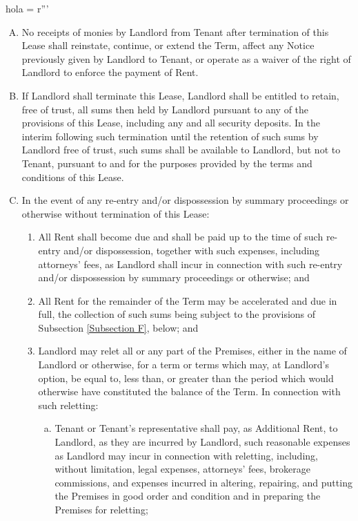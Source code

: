 hola = r'''\documentclass{article}
\begin{document}
\begin{enumerate}[(A)]
    \item	No receipts of monies by Landlord from Tenant after termination of this Lease shall reinstate, continue, or extend the Term, affect any Notice previously given by Landlord to Tenant, or operate as a waiver of the right of Landlord to enforce the payment of Rent.

    \item	If Landlord shall terminate this Lease, Landlord shall be entitled to retain, free of trust, all sums then held by Landlord pursuant to any of the provisions of this Lease, including any and all security deposits. In the interim following such termination until the retention of such sums by Landlord free of trust, such sums shall be available to Landlord, but not to Tenant, pursuant to and for the purposes provided by the terms and conditions of this Lease.

    \item	In the event of any re-entry and/or dispossession by summary proceedings or otherwise without termination of this Lease:
    
    \begin{enumerate}[I]
    \item All Rent shall become due and shall be paid up to the time of such re-entry and/or dispossession, together with such expenses, including attorneys' fees, as Landlord shall incur in connection with such re-entry and/or dispossession by summary proceedings or otherwise; and

    \item All Rent for the remainder of the Term may be accelerated and due in full, the collection of such sums being subject to the provisions of Subsection \ref{Subsection F}, below; and

    \item Landlord may relet all or any part of the Premises, either in the name of Landlord or otherwise, for a term or terms which may, at Landlord's option, be equal to, less than, or greater than the period which would otherwise have constituted the balance of the Term. In connection with such reletting:
    \begin{enumerate}[(a)]
    \item Tenant or Tenant's representative shall pay, as Additional Rent, to Landlord, as they are incurred by Landlord, such reasonable expenses as Landlord may incur in connection with reletting, including, without limitation, legal expenses, attorneys' fees, brokerage commissions, and expenses incurred in altering, repairing, and putting the Premises in good order and condition and in preparing the Premises for reletting;


\end{enumerate}
\end{enumerate}
\end{enumerate}
\end{document}
